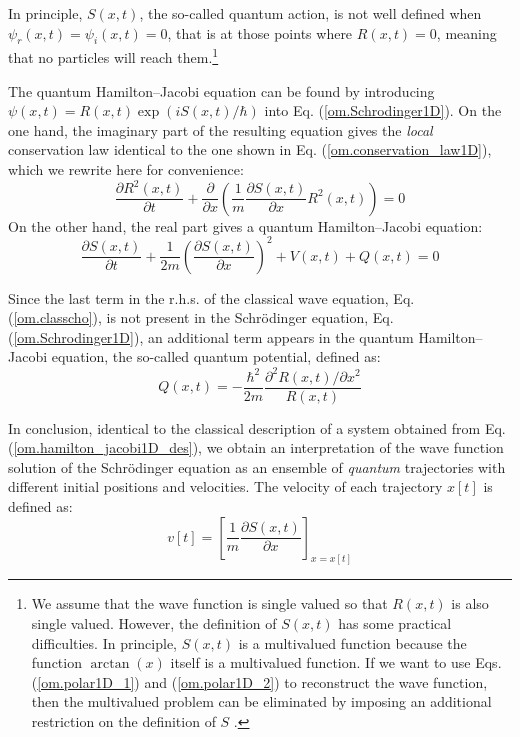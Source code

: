 \documentclass[nofootinbib, secnumarabic, amsmath, nobibnotes,10pt,aps,pra]{revtex4-1}
\newcommand{\eref}[1]{Eq. (\ref{#1})}
\begin{document}
In principle, $S(x,t)$, the so-called quantum action, is not well defined when $\psi_r(x,t) =
\psi_i(x,t) = 0$, that is  at those points where $R(x,t) = 0$, meaning that no
particles will reach them.\footnote{We assume that the wave function
is single valued so that $R(x,t)$ is also single valued. However,
the definition of $S(x,t)$ has some practical difficulties. In
principle, $S(x,t)$ is a multivalued function because the function
$\arctan(x)$ itself is a multivalued function. If we want to use
Eqs. (\ref{om.polar1D_1}) and (\ref{om.polar1D_2}) to reconstruct
the wave function, then the multivalued problem can be eliminated by
imposing an  additional restriction on the definition of
$S$ \cite{om.Holand1993,om.Bohm1993,om.Durrllibre,om.reviewabc,om.llibreph}.}

The quantum Hamilton--Jacobi equation can be found by introducing $\psi(x,t) = R(x,t) \exp(i S(x,t)/\hbar)$ into \eref{om.Schrodinger1D}. On the one hand, the imaginary part of the resulting equation gives the \textit{local} conservation law identical to the one shown in \eref{om.conservation_law1D}, which we rewrite here for convenience:
\begin{equation}
\frac{\partial R^2(x,t)}{\partial t} + \frac {\partial } {\partial x} \left(\frac {1} {m} \frac {\partial S(x,t)}{\partial x} R^2(x,t) \right) = 0
\end{equation}
On the other hand, the real part gives a quantum Hamilton--Jacobi equation:
\begin{equation}
\label{om.hamilton_jacobi1D_des}
\frac{\partial S(x,t)}{\partial t} + \frac {1} {2 m} \left(\frac{ \partial S(x,t)} {\partial x} \right)^2 + V(x,t) + Q(x,t) = 0
\end{equation}

Since the last term in the r.h.s. of the classical wave equation, \eref{om.classcho}, is not present in the Schr\"odinger equation, \eref{om.Schrodinger1D}, an additional term appears in the quantum Hamilton--Jacobi equation, the so-called quantum potential, defined as:
\begin{equation}
\label{om.quantum_potential1D}
Q(x,t) = -\frac{\hbar^2} {2 m} \frac{{\partial}^2 R(x,t)/ \partial x^2} {R(x,t)}
\end{equation}

In conclusion, identical to the classical description of a system obtained from \eref{om.hamilton_jacobi1D_des}, we obtain an interpretation of the wave function solution of the Schr\"odinger equation as an ensemble of \textit{quantum} trajectories with different initial positions and velocities.
The velocity of each trajectory $x[t]$ is defined as:
\begin{equation}
\label{om.velocity_dSdx}
v[t] = \left[\frac{1}{m} \frac{\partial S(x,t)}{\partial x}\right]_{x = x[t]}
\end{equation}
\end{document}

